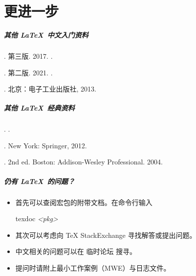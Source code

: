 
\part{更进一步}

\begin{frame}
  \frametitle{其他 \LaTeX\ 中文入门资料}
  \begin{mybibliography}
    \item {}
     . 第三版. 2017.
    .

    \item {}
     . 第二版. 2021.
    .

    \item {}
     . 
    北京：电子工业出版社, 2013.
  \end{mybibliography}
\end{frame}

\begin{frame}
  \frametitle{其他 \LaTeX\ 经典资料}
  \begin{mybibliography}
    \item {}
     . 
    .

    \item {}
     . New York: Springer, 2012. 

    \item {}
     . 2nd ed. Boston: Addison-Wesley Professional. 2004.
  \end{mybibliography}
\end{frame}

\begin{frame}
  \frametitle{仍有 \LaTeX\ 的问题？}
  \begin{itemize}
    \item 首先可以查阅宏包的附带文档。在命令行输入
    
    \hfill
    \begin{minipage}{0.3\textwidth}
      \begin{exampleblock}{\faTerminal}
        \ttfamily
        texdoc \textit{<pkg>}
      \end{exampleblock}
    \end{minipage}
    \item 其次可以考虑向 \TeX{} StackExchange  寻找解答或提出问题。
    \item 中文相关的问题可以在 \CTeX{} 临时论坛  搜寻。
    \item 提问时请附上最小工作案例（MWE）与日志文件。
  \end{itemize}
\end{frame}

